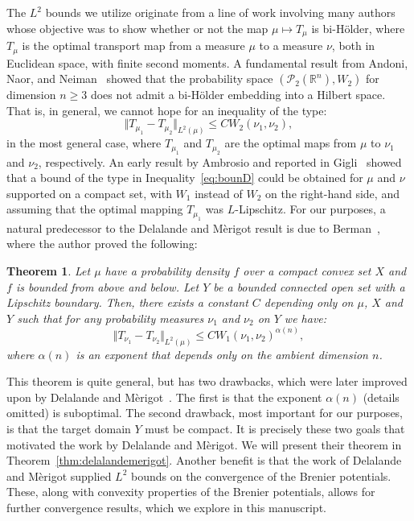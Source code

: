 \documentclass{amsart}
\newtheorem{theorem}{Theorem}
\theoremstyle{lemma}
\theoremstyle{remark}
\begin{document}
The $L^2$ bounds we utilize originate from a line of work involving many authors whose objective was to show whether or not the map $\mu \mapsto T_{\mu}$ is bi-H\"{o}lder, where $T_{\mu}$ is the optimal transport map from a measure $\mu$ to a measure $\nu$, both in Euclidean space, with finite second moments. A fundamental result from Andoni, Naor, and Neiman~\cite{snowflake} showed that the probability space $(\mathcal{P}_{2}(\mathbb{R}^n), W_{2})$ for dimension $n \geq 3$ does not admit a bi-H\"{o}lder embedding into a Hilbert space. That is, in general, we cannot hope for an inequality of the type:
\begin{equation}\label{eq:bounD}
\Vert T_{\mu_{1}} - T_{\mu_{2}} \Vert_{L^2(\mu)} \leq C W_{2}(\nu_{1}, \nu_{2}),
\end{equation}
in the most general case, where $T_{\mu_{1}}$ and $T_{\mu_{2}}$ are the optimal maps from $\mu$ to $\nu_1$ and $\nu_{2}$, respectively. An early result by Ambrosio and reported in Gigli~\cite{giglibounds} showed that a bound of the type in Inequality~\eqref{eq:bounD} could be obtained for $\mu$ and $\nu$ supported on a compact set, with $W_1$ instead of $W_2$ on the right-hand side, and assuming that the optimal mapping $T_{\mu_{1}}$ was $L$-Lipschitz. For our purposes, a natural predecessor to the Delalande and M\`{e}rigot result is due to Berman~\cite{berman}, where the author proved the following:
\begin{theorem}
Let $\mu$ have a probability density $f$ over a compact convex set $X$ and $f$ is bounded from above and below. Let $Y$ be a bounded connected open set with a Lipschitz boundary. Then, there exists a constant $C$ depending only on $\mu$, $X$ and $Y$ such that for any probability measures $\nu_{1}$ and $\nu_{2}$ on $Y$ we have:
\begin{equation}
\Vert T_{\nu_{1}} - T_{\nu_{2}} \Vert_{L^2(\mu)} \leq C W_{1}(\nu_{1}, \nu_{2})^{\alpha(n)},
\end{equation}
where $\alpha(n)$ is an exponent that depends only on the ambient dimension $n$.
\end{theorem}
This theorem is quite general, but has two drawbacks, which were later improved upon by Delalande and M\`{e}rigot~\cite{merigot1}. The first is that the exponent $\alpha(n)$ (details omitted) is suboptimal. The second drawback, most important for our purposes, is that the target domain $Y$ must be compact. It is precisely these two goals that motivated the work by Delalande and M\`{e}rigot. We will present their theorem in Theorem~\ref{thm:delalandemerigot}. Another benefit is that the work of Delalande and M\`{e}rigot supplied $L^2$ bounds on the convergence of the Brenier potentials. These, along with convexity properties of the Brenier potentials, allows for further convergence results, which we explore in this manuscript.
\end{document}
